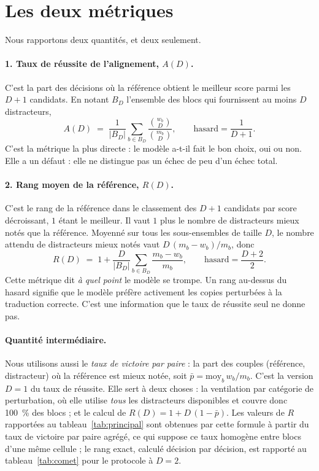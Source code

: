 \documentclass[11pt]{article}
\begin{document}
\section{Les deux métriques}

Nous rapportons deux quantités, et deux seulement.

\paragraph{1. Taux de réussite de l'alignement, $A(D)$.}
C'est la part des décisions où la référence obtient le meilleur score parmi les $D+1$ candidats.
En notant $B_D$ l'ensemble des blocs qui fournissent au moins $D$ distracteurs,
\[
A(D) \;=\; \frac{1}{|B_D|} \sum_{b \in B_D} \frac{\binom{w_b}{D}}{\binom{m_b}{D}} ,
\qquad \text{hasard} = \frac{1}{D+1}.
\]
C'est la métrique la plus directe : le modèle a-t-il fait le bon choix, oui ou non.
Elle a un défaut : elle ne distingue pas un échec de peu d'un échec total.

\paragraph{2. Rang moyen de la référence, $R(D)$.}
C'est le rang de la référence dans le classement des $D+1$ candidats par score décroissant, $1$ étant le meilleur.
Il vaut $1$ plus le nombre de distracteurs mieux notés que la référence.
Moyenné sur tous les sous-ensembles de taille $D$, le nombre attendu de distracteurs mieux notés vaut $D\,(m_b-w_b)/m_b$, donc
\[
R(D) \;=\; 1 + \frac{D}{|B_D|} \sum_{b \in B_D} \frac{m_b - w_b}{m_b} ,
\qquad \text{hasard} = \frac{D+2}{2}.
\]
Cette métrique dit \emph{à quel point} le modèle se trompe.
Un rang au-dessus du hasard signifie que le modèle préfère activement les copies perturbées à la traduction correcte.
C'est une information que le taux de réussite seul ne donne pas.

\paragraph{Quantité intermédiaire.}
Nous utilisons aussi le \emph{taux de victoire par paire} : la part des couples (référence, distracteur) où la référence est mieux notée, soit $\bar p = \mathrm{moy}_b\, w_b/m_b$.
C'est la version $D=1$ du taux de réussite.
Elle sert à deux choses : la ventilation par catégorie de perturbation, où elle utilise \emph{tous} les distracteurs disponibles et couvre donc 100~\% des blocs ; et le calcul de $R(D) = 1 + D\,(1-\bar p)$.
Les valeurs de $R$ rapportées au tableau~\ref{tab:principal} sont obtenues par cette formule à partir du taux de victoire par paire agrégé, ce qui suppose ce taux homogène entre blocs d'une même cellule ; le rang exact, calculé décision par décision, est rapporté au tableau~\ref{tab:comet} pour le protocole à $D=2$.
\end{document}
